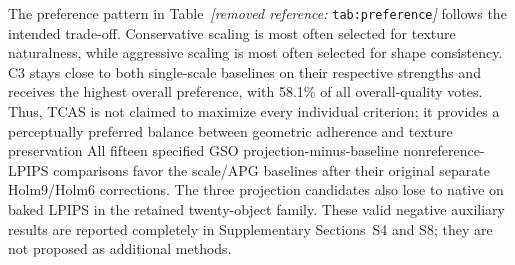 \documentclass[times,twocolumn,final]{elsarticle}
\providecommand{\DIFadd}[1]{{\protect\color{blue} \sf #1}} %
\providecommand{\DIFdel}[1]{{\protect\color{red} \scriptsize #1}} %
\providecommand{\DIFaddbegin}{} %
\providecommand{\DIFaddend}{} %
\providecommand{\DIFdelbegin}{} %
\providecommand{\DIFdelend}{} %
\begin{document}
\DIFdelbegin %

\DIFdel{The preference pattern in Table~\textit{[removed reference: }\texttt{tab:preference}\textit{]} follows the intended trade-off. Conservative scaling is most often selected for texture naturalness, while aggressive scaling is most often selected for shape consistency. C3 stays close to both single-scale baselines on their respective strengths and receives the highest overall preference, with 58.1\% of all overall-quality votes. Thus, TCAS is not claimed to maximize every individual criterion; it provides a perceptually preferred balance between geometric adherence and texture preservation}\DIFdelend \DIFaddbegin \DIFadd{All fifteen specified GSO projection-minus-baseline nonreference-LPIPS comparisons favor the scale/APG baselines after their original separate Holm9/Holm6 corrections. The three projection candidates also lose to native on baked LPIPS in the retained twenty-object family. These valid negative auxiliary results are reported completely in Supplementary Sections~S4 and S8; they are not proposed as additional methods}\DIFaddend .
\end{document}
